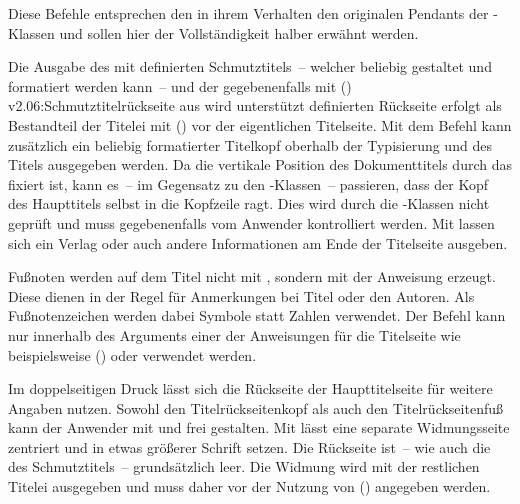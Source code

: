\begin{DeclareEntity*}{}
\begin{DeclareEntity*}{}
\begin{DeclareEntity*}{}
\begin{Entity}{}
\begin{Declaration}
\begin{Declaration}
\begin{Declaration}
\begin{Declaration}
\begin{Declaration}
\begin{Declaration}
\begin{Declaration}
\begin{Declaration}
Diese Befehle entsprechen den in ihrem Verhalten den originalen Pendants der 
\KOMAScript-Klassen und sollen hier der Vollständigkeit halber erwähnt werden.

Die Ausgabe des mit  definierten Schmutztitels~-- welcher 
beliebig gestaltet und formatiert werden kann~-- und der gegebenenfalls mit 
(){%
  v2.06:Schmutztitelrückseite aus  wird unterstützt%
}%
 definierten Rückseite erfolgt als Bestandteil der Titelei 
mit () vor der eigentlichen Titelseite. Mit dem Befehl 
 kann zusätzlich ein beliebig formatierter Titelkopf oberhalb 
der Typisierung und des Titels ausgegeben werden. Da die vertikale Position des 
Dokumenttitels durch das \CD fixiert ist, kann es~-- im Gegensatz zu den 
\KOMAScript-Klassen~-- passieren, dass der Kopf des Haupttitels selbst in die 
Kopfzeile ragt. Dies wird durch die \TUDScript-Klassen nicht geprüft und muss 
gegebenenfalls vom Anwender kontrolliert werden. Mit  lassen 
sich ein Verlag oder auch andere Informationen am Ende der Titelseite ausgeben.

Fußnoten werden auf dem Titel nicht mit , sondern mit der 
Anweisung  erzeugt. Diese dienen in der Regel für Anmerkungen bei 
Titel oder den Autoren. Als Fußnotenzeichen werden dabei Symbole statt Zahlen 
verwendet. Der Befehl  kann nur innerhalb des Arguments einer der 
Anweisungen für die Titelseite wie beispielsweise () oder 
 verwendet werden.

%
Im doppelseitigen Druck lässt sich die Rückseite der Haupttitelseite für 
weitere Angaben nutzen. Sowohl den Titelrückseitenkopf als auch den
Titelrückseitenfuß kann der Anwender mit  und 
 frei gestalten. Mit  lässt eine 
separate Widmungsseite zentriert und in etwas größerer Schrift setzen. Die 
Rückseite ist~-- wie auch die des Schmutztitels~-- grundsätzlich leer. Die 
Widmung wird mit der restlichen Titelei ausgegeben und muss daher vor der 
Nutzung von () angegeben werden.
\end{Declaration}
\end{Declaration}
\end{Declaration}
\end{Declaration}
\end{Declaration}
\end{Declaration}
\end{Declaration}
\end{Declaration}
%
\end{Entity}




\end{DeclareEntity*}
\end{DeclareEntity*}
\end{DeclareEntity*}
